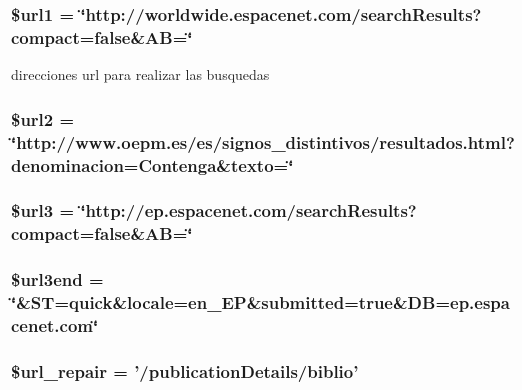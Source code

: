 \hypertarget{accion_8php_a6b780572d403730c4f958bfff1a7a7c4}{
\subsubsection[{\$url1}]{\setlength{\rightskip}{0pt plus 5cm}\$url1 = \char`\"{}http\-://worldwide.\-espacenet.\-com/search\-Results?compact=false\&A\-B=\char`\"{}}}\label{accion_8php_a6b780572d403730c4f958bfff1a7a7c4}
direcciones url para realizar las busquedas \hypertarget{accion_8php_a22d7d56cce8f1edfe80520f5ecd53299}{
\subsubsection[{\$url2}]{\setlength{\rightskip}{0pt plus 5cm}\$url2 = \char`\"{}http\-://www.\-oepm.\-es/es/signos\-\_\-distintivos/resultados.\-html?denominacion=Contenga\&texto=\char`\"{}}}\label{accion_8php_a22d7d56cce8f1edfe80520f5ecd53299}
\hypertarget{accion_8php_adc558598df5e4c075fae9e30c8825716}{
\subsubsection[{\$url3}]{\setlength{\rightskip}{0pt plus 5cm}\$url3 = \char`\"{}http\-://ep.\-espacenet.\-com/search\-Results?compact=false\&A\-B=\char`\"{}}}\label{accion_8php_adc558598df5e4c075fae9e30c8825716}
\hypertarget{accion_8php_a55166030a9a63cf5f84e1fbf035e4857}{
\subsubsection[{\$url3end}]{\setlength{\rightskip}{0pt plus 5cm}\$url3end = \char`\"{}\&S\-T=quick\&locale=en\-\_\-\-E\-P\&submitted=true\&D\-B=ep.\-espacenet.\-com\char`\"{}}}\label{accion_8php_a55166030a9a63cf5f84e1fbf035e4857}
\hypertarget{accion_8php_af22f03a42ae9a75c7c756dbf6fa0c53f}{
\subsubsection[{\$url\-\_\-repair}]{\setlength{\rightskip}{0pt plus 5cm}\$url\-\_\-repair = '/publication\-Details/biblio'}}\label{accion_8php_af22f03a42ae9a75c7c756dbf6fa0c53f}
